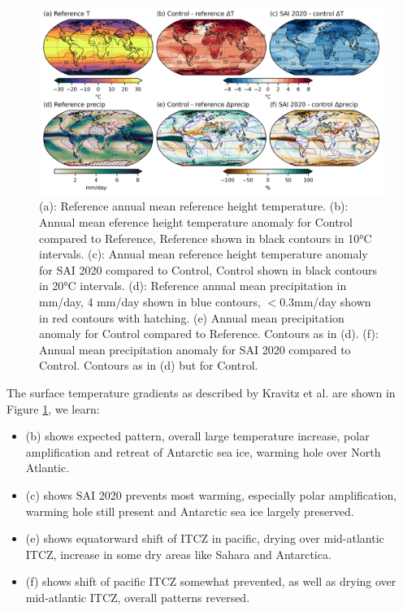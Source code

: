 \begin{figure}[H]
	\centering
	\includegraphics[width=\linewidth]{../Paper_imgs/CAM_scens.png}
	\caption{(a): Reference annual mean reference height temperature. (b): Annual mean eference height temperature anomaly for Control compared to Reference, Reference shown in black contours in 10°C intervals. (c): Annual mean reference height temperature anomaly for SAI 2020 compared to Control, Control shown in black contours in 20°C intervals. (d): Reference annual mean precipitation in mm/day, 4 mm/day shown in blue contours, $<0.3$mm/day shown in red contours with hatching. (e) Annual mean precipitation anomaly for Control compared to Reference. Contours as in (d). (f): Annual mean precipitation anomaly for SAI 2020 compared to Control. Contours as in (d) but for Control.}
	\label{fig:CAM_map}
\end{figure}

The surface temperature gradients as described by Kravitz et al. are shown in Figure \ref{fig:CAM_map}, we learn:
\begin{itemize}
	\item (b) shows expected pattern, overall large temperature increase, polar amplification and retreat of Antarctic sea ice, warming hole over North Atlantic. 
	\item (c) shows SAI 2020 prevents most warming, especially polar amplification, warming hole still present and Antarctic sea ice largely preserved. 
	\item (e) shows equatorward shift of ITCZ in pacific, drying over mid-atlantic ITCZ, increase in some dry areas like Sahara and Antarctica.
	\item (f) shows shift of pacific ITCZ somewhat prevented, as well as drying over mid-atlantic ITCZ, overall patterns reversed. 
\end{itemize}

